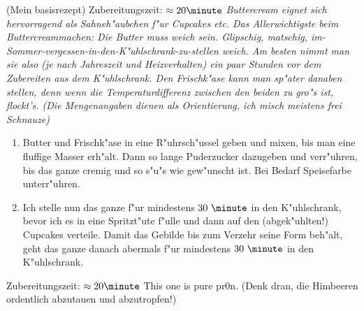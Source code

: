 (Mein basisrezept) \hfill Zubereitungszeit: $\approx20 \minute$
\textit{Buttercream eignet sich hervorragend als Sahneh"aubchen f"ur Cupcakes etc.
Das Allerwichtigste beim Buttercreammachen: Die Butter muss weich sein. Glipschig, matschig, im-Sommer-vergessen-in-den-K"uhlschrank-zu-stellen weich.
Am besten nimmt man sie also (je nach Jahreszeit und Heizverhalten) ein paar Stunden vor dem Zubereiten
aus dem K"uhlschrank. Den Frischk"ase kann man sp"ater danaben stellen, denn wenn die Temperaturdifferenz zwischen den beiden zu gro"s ist, flockt's.
(Die Mengenangaben dienen als Orientierung, ich misch meistens frei Schnauze)}

\begin{enumerate}
\item	Butter und Frischk"ase in eine R"uhrsch"ussel geben und mixen, bis man eine fluffige Masser erh"alt.
      Dann so lange Puderzucker dazugeben und verr"uhren, bis das ganze cremig und so s"u"s wie gew"unscht ist.
      Bei Bedarf Speisefarbe unterr"uhren.
\item	Ich stelle nun das ganze f"ur mindestens $30~\minute$ in den K"uhlschrank, bevor ich es in eine Spritzt"ute f"ulle
      und dann auf den (abgek"uhlten!) Cupcakes verteile. Damit das Gebilde bis zum Verzehr seine Form beh"alt,
      geht das ganze danach abermals f"ur mindestens $30~\minute$ in den K"uhlschrank.
\end{enumerate}

\hfill Zubereitungszeit: $\approx20 \minute$
This one is pure pr0n. (Denk dran, die Himbeeren ordentlich abzutauen und abzutropfen!)

